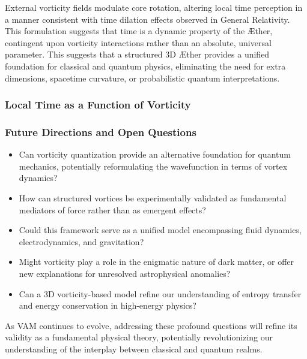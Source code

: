 External vorticity fields modulate core rotation, altering local time perception in a manner consistent with time dilation effects observed in General Relativity.
This formulation suggests that time is a dynamic property of the Æther, contingent upon vorticity interactions rather than an absolute, universal parameter.
    This suggests that a structured 3D Æther provides a unified foundation for classical and quantum physics, eliminating the need for extra dimensions, spacetime curvature, or probabilistic quantum interpretations.

\subsubsection*{Local Time as a Function of Vorticity}\label{subsubsec:local-time-as-a-function-of-vorticity}



\subsubsection*{Future Directions and Open Questions}
\begin{itemize}
    \item Can vorticity quantization provide an alternative foundation for quantum mechanics, potentially reformulating the wavefunction in terms of vortex dynamics?
    \item How can structured vortices be experimentally validated as fundamental mediators of force rather than as emergent effects?
    \item Could this framework serve as a unified model encompassing fluid dynamics, electrodynamics, and gravitation?
    \item Might vorticity play a role in the enigmatic nature of dark matter, or offer new explanations for unresolved astrophysical anomalies?
    \item Can a 3D vorticity-based model refine our understanding of entropy transfer and energy conservation in high-energy physics?
\end{itemize}

As VAM continues to evolve, addressing these profound questions will refine its validity as a fundamental physical theory, potentially revolutionizing our understanding of the interplay between classical and quantum realms.

